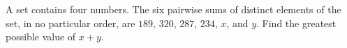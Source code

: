 A set contains four numbers. The six pairwise sums of distinct elements of the set, in no particular order, are $189$,  $320$,  $287$,  $234$,  $x$,  and $y$. Find the greatest possible value of $x+y$.